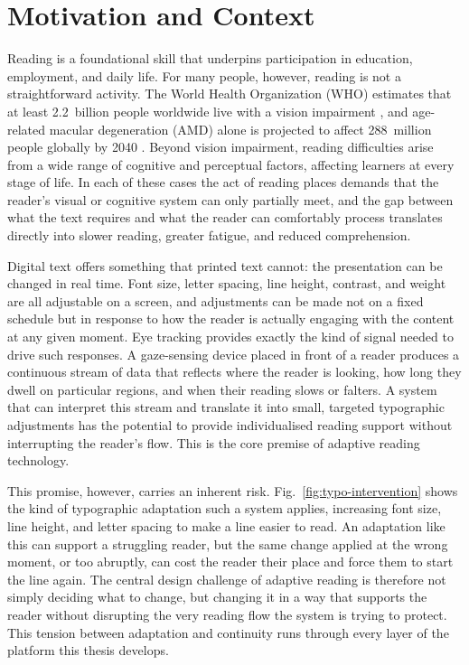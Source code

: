 \section{Motivation and Context}
\label{sec:motivation}

Reading is a foundational skill that underpins participation in education, employment, and daily life.
For many people, however, reading is not a straightforward activity.
The World Health Organization (WHO) estimates that at least 2.2~billion people worldwide live with a vision impairment \cite{who2026vision}, and age-related macular degeneration (AMD) alone is projected to affect 288~million people globally by 2040 \cite{apte2021amd}.
Beyond vision impairment, reading difficulties arise from a wide range of cognitive and perceptual factors, affecting learners at every stage of life.
In each of these cases the act of reading places demands that the reader's visual or cognitive system can only partially meet, and the gap between what the text requires and what the reader can comfortably process translates directly into slower reading, greater fatigue, and reduced comprehension.

Digital text offers something that printed text cannot: the presentation can be changed in real time.
Font size, letter spacing, line height, contrast, and weight are all adjustable on a screen, and adjustments can be made not on a fixed schedule but in response to how the reader is actually engaging with the content at any given moment.
Eye tracking provides exactly the kind of signal needed to drive such responses.
A gaze-sensing device placed in front of a reader produces a continuous stream of data that reflects where the reader is looking, how long they dwell on particular regions, and when their reading slows or falters.
A system that can interpret this stream and translate it into small, targeted typographic adjustments has the potential to provide individualised reading support without interrupting the reader's flow.
This is the core premise of adaptive reading technology.

This promise, however, carries an inherent risk.
Fig.~\ref{fig:typo-intervention} shows the kind of typographic adaptation such a system applies, increasing font size, line height, and letter spacing to make a line easier to read.
An adaptation like this can support a struggling reader, but the same change applied at the wrong moment, or too abruptly, can cost the reader their place and force them to start the line again.
The central design challenge of adaptive reading is therefore not simply deciding what to change, but changing it in a way that supports the reader without disrupting the very reading flow the system is trying to protect.
This tension between adaptation and continuity runs through every layer of the platform this thesis develops.

